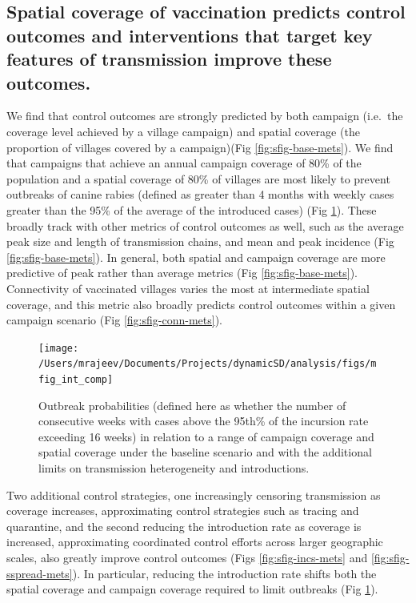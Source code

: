 \documentclass[
  oneside]{book}
\begin{document}
\hypertarget{spatial-coverage-of-vaccination-predicts-control-outcomes-and-interventions-that-target-key-features-of-transmission-improve-these-outcomes.}{%
\subsection{Spatial coverage of vaccination predicts control outcomes and interventions that target key features of transmission improve these outcomes.}\label{spatial-coverage-of-vaccination-predicts-control-outcomes-and-interventions-that-target-key-features-of-transmission-improve-these-outcomes.}}

We find that control outcomes are strongly predicted by both campaign (i.e.~the coverage level achieved by a village campaign) and spatial coverage (the proportion of villages covered by a campaign)(Fig \ref{fig:sfig-base-mets}). We find that campaigns that achieve an annual campaign coverage of 80\% of the population and a spatial coverage of 80\% of villages are most likely to prevent outbreaks of canine rabies (defined as greater than 4 months with weekly cases greater than the 95\% of the average of the introduced cases) (Fig \ref{fig:mfig-int-comp}). These broadly track with other metrics of control outcomes as well, such as the average peak size and length of transmission chains, and mean and peak incidence (Fig \ref{fig:sfig-base-mets}). In general, both spatial and campaign coverage are more predictive of peak rather than average metrics (Fig \ref{fig:sfig-base-mets}). Connectivity of vaccinated villages varies the most at intermediate spatial coverage, and this metric also broadly predicts control outcomes within a given campaign scenario (Fig \ref{fig:sfig-conn-mets}).

\begin{figure}
\texttt{[image: /Users/mrajeev/Documents/Projects/dynamicSD/analysis/figs/mfig\_int\_comp]} \caption[Outbreak probabilities across range of coverage and intervention scenarios.]{Outbreak probabilities (defined here as whether the number of consecutive weeks with cases above the 95th\% of the incursion rate exceeding 16 weeks) in relation to a range of campaign coverage and spatial coverage under the baseline scenario and with the additional limits on transmission heterogeneity and introductions.}\label{fig:mfig-int-comp}
\end{figure}



Two additional control strategies, one increasingly censoring transmission as coverage increases, approximating control strategies such as tracing and quarantine, and the second reducing the introduction rate as coverage is increased, approximating coordinated control efforts across larger geographic scales, also greatly improve control outcomes (Figs \ref{fig:sfig-incs-mets} and \ref{fig:sfig-sspread-mets}). In particular, reducing the introduction rate shifts both the spatial coverage and campaign coverage required to limit outbreaks (Fig \ref{fig:mfig-int-comp}).
\end{document}
